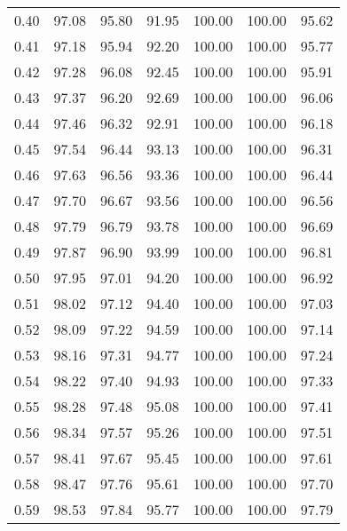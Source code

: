 \begin{tabular}{|c|c|c|c|c|c|c|}
      0.40 &     97.08 &     95.80 &      91.95 &  100.00 &     100.00 &         95.62 \\
      0.41 &     97.18 &     95.94 &      92.20 &  100.00 &     100.00 &         95.77 \\
      0.42 &     97.28 &     96.08 &      92.45 &  100.00 &     100.00 &         95.91 \\
      0.43 &     97.37 &     96.20 &      92.69 &  100.00 &     100.00 &         96.06 \\
      0.44 &     97.46 &     96.32 &      92.91 &  100.00 &     100.00 &         96.18 \\
      0.45 &     97.54 &     96.44 &      93.13 &  100.00 &     100.00 &         96.31 \\
      0.46 &     97.63 &     96.56 &      93.36 &  100.00 &     100.00 &         96.44 \\
      0.47 &     97.70 &     96.67 &      93.56 &  100.00 &     100.00 &         96.56 \\
      0.48 &     97.79 &     96.79 &      93.78 &  100.00 &     100.00 &         96.69 \\
      0.49 &     97.87 &     96.90 &      93.99 &  100.00 &     100.00 &         96.81 \\
      0.50 &     97.95 &     97.01 &      94.20 &  100.00 &     100.00 &         96.92 \\
      0.51 &     98.02 &     97.12 &      94.40 &  100.00 &     100.00 &         97.03 \\
      0.52 &     98.09 &     97.22 &      94.59 &  100.00 &     100.00 &         97.14 \\
      0.53 &     98.16 &     97.31 &      94.77 &  100.00 &     100.00 &         97.24 \\
      0.54 &     98.22 &     97.40 &      94.93 &  100.00 &     100.00 &         97.33 \\
      0.55 &     98.28 &     97.48 &      95.08 &  100.00 &     100.00 &         97.41 \\
      0.56 &     98.34 &     97.57 &      95.26 &  100.00 &     100.00 &         97.51 \\
      0.57 &     98.41 &     97.67 &      95.45 &  100.00 &     100.00 &         97.61 \\
      0.58 &     98.47 &     97.76 &      95.61 &  100.00 &     100.00 &         97.70 \\
      0.59 &     98.53 &     97.84 &      95.77 &  100.00 &     100.00 &         97.79 \\

\end{tabular}

